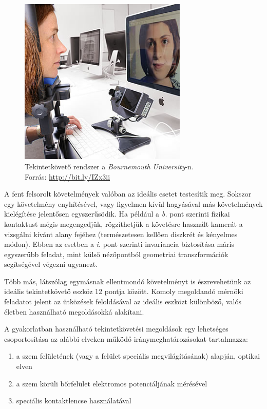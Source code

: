 \begin{figure}[!ht]
\centering
\includegraphics[width=80mm, keepaspectratio]{figures/tracking_system.jpg}
\caption{Tekintetkövető rendszer a \emph{Bournemouth University}-n.\\Forrás: \url{http://bit.ly/IZx3ii}}
\label{fig:tracking_system}
\end{figure}

A fent felsorolt követelmények valóban az ideális esetet testesítik meg. Sokszor egy követelmény enyhítésével, vagy figyelmen kívül hagyásával más követelmények kielégítése jelentősen egyszerűsödik. Ha például a \emph{b.} pont szerinti fizikai kontaktust mégis megengedjük, rögzíthetjük a követésre használt kamerát a vizsgálni kívánt alany fejéhez (természetesen kellően diszkrét és kényelmes módon). Ebben az esetben a \emph{i.} pont szerinti invariancia biztosítása máris egyszerűbb feladat, mint külső nézőpontból geometriai transzformációk segítségével végezni ugyanezt.

Több más, látszólag egymásnak ellentmondó követelményt is észrevehetünk az ideális tekintetkövető eszköz 12 pontja között. Komoly megoldandó mérnöki feladatot jelent az ütközések feloldásával az ideális eszközt különböző, valós életben használható megoldásokká alakítani.

\bigskip

A gyakorlatban használható tekintetkövetési megoldások egy lehetséges csoportosítása az alábbi elveken működő iránymeghatározásokat tartalmazza:

\begin{enumerate}
 \item a szem felületének (vagy a felület speciális megvilágításának) alapján, optikai elven 
 \item a szem körüli bőrfelület elektromos potenciáljának mérésével
 \item speciális kontaktlencse használatával
\end{enumerate}

